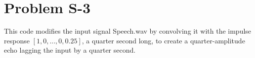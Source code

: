 \documentclass{article}
\begin{document}
\pagestyle{fancy}
\section*{Problem S-3}


This code modifies the input signal Speech.wav by convolving it with the impulse response $[1, 0, ... , 0, 0.25]$, a quarter second long, to create a quarter-amplitude echo lagging the input by a quarter second.
\end{document}
